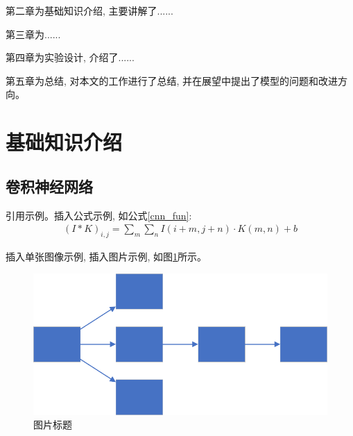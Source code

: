 \documentclass[UTF8, twoside]{ctexart}
\begin{document}
第二章为基础知识介绍, 主要讲解了......

第三章为......

第四章为实验设计, 介绍了......

第五章为总结, 对本文的工作进行了总结, 并在展望中提出了模型的问题和改进方向。

\vspace*{3pt}
\cleardoublepage
\section{基础知识介绍}
\subsection{卷积神经网络}
引用示例\cite{lenet1998,alexnet}。插入公式示例, 如公式\eqref{cnn_fun}:
\begin{align}
    (I * K)_{i, j}=\sum_m \sum_n I(i + m, j + n) \cdot K(m, n) + b
    \label{cnn_fun}
\end{align}

插入单张图像示例, 插入图片示例, 如图\ref{cnn_fig}所示。
\begin{figure}[tbhp]
    \centering
    \includegraphics[scale=0.5]{figures/1.pdf}
    \caption{图片标题}
    \label{cnn_fig}
\end{figure}
\end{document}
